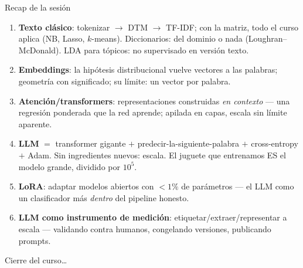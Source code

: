 \documentclass{beamer}
\newcommand{\1}{\mathbb{I}}
\begin{document}
\begin{frame}{Recap de la sesión}
\small
\begin{enumerate}\itemsep5pt
  \item \textbf{Texto clásico}: tokenizar $\rightarrow$ DTM $\rightarrow$ TF-IDF; con la matriz, todo el curso aplica (NB, Lasso, $k$-means). Diccionarios: del dominio o nada (Loughran--McDonald). LDA para tópicos: no supervisado en versión texto.
  \item \textbf{Embeddings}: la hipótesis distribucional vuelve vectores a las palabras; geometría con significado; su límite: un vector por palabra.
  \item \textbf{Atención/transformers}: representaciones construidas \emph{en contexto} --- una regresión ponderada que la red aprende; apilada en capas, escala sin límite aparente.
  \item \textbf{LLM} $=$ transformer gigante $+$ predecir-la-siguiente-palabra $+$ cross-entropy $+$ Adam. Sin ingredientes nuevos: escala. El juguete que entrenamos ES el modelo grande, dividido por $10^5$.
  \item \textbf{LoRA}: adaptar modelos abiertos con $<1\%$ de parámetros --- el LLM como un clasificador más \emph{dentro} del pipeline honesto.
  \item \textbf{LLM como instrumento de medición}: etiquetar/extraer/representar a escala --- validando contra humanos, congelando versiones, publicando prompts.
\end{enumerate}
\end{frame}

\begin{frame}
\vspace{2.0cm}
\Large{Cierre del curso\ldots}
\end{frame}
\end{document}
